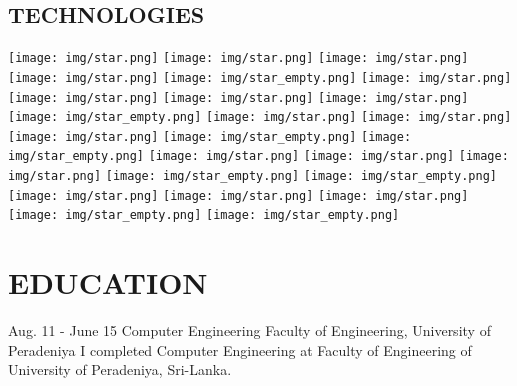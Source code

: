 \documentclass[]{cv-class}
\begin{document}
\begin{aside}
  \section{TECHNOLOGIES}
    {\texttt{[image: img/star.png]}
    \texttt{[image: img/star.png]}
    \texttt{[image: img/star.png]}
    \texttt{[image: img/star.png]}
    \texttt{[image: img/star\_empty.png]}}
    {\texttt{[image: img/star.png]}
    \texttt{[image: img/star.png]}
    \texttt{[image: img/star.png]}
    \texttt{[image: img/star.png]}
    \texttt{[image: img/star\_empty.png]}}
    {\texttt{[image: img/star.png]}
    \texttt{[image: img/star.png]}
    \texttt{[image: img/star.png]}
    \texttt{[image: img/star\_empty.png]}
    \texttt{[image: img/star\_empty.png]}}
    {\texttt{[image: img/star.png]}
    \texttt{[image: img/star.png]}
    \texttt{[image: img/star.png]}
    \texttt{[image: img/star\_empty.png]}
    \texttt{[image: img/star\_empty.png]}}
    {\texttt{[image: img/star.png]}
    \texttt{[image: img/star.png]}
    \texttt{[image: img/star.png]}
    \texttt{[image: img/star\_empty.png]}
    \texttt{[image: img/star\_empty.png]}}
    ~
\end{aside}

\section{EDUCATION}
\begin{entrylist}
  \entry
    {Aug. 11 - June 15}
    {Computer Engineering}
    {Faculty of Engineering, University of Peradeniya}
    {I completed Computer Engineering at Faculty of Engineering of University of Peradeniya, Sri-Lanka.}
\end{entrylist}
\end{document}
